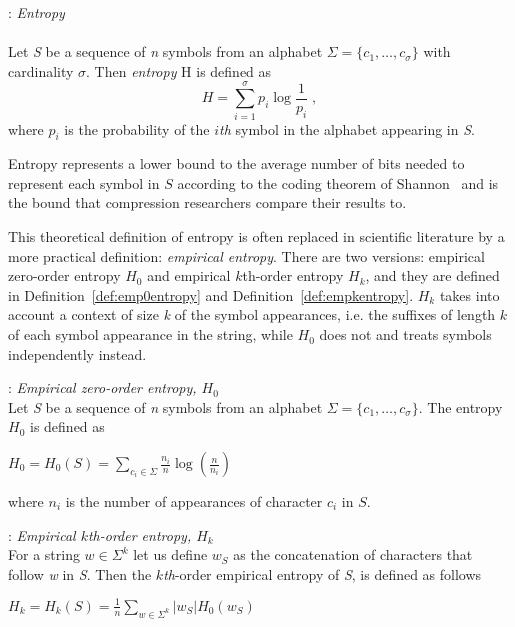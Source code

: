 \begin{floatdef}
\begin{mdframed}[nobreak, linecolor=lightgray, linewidth=2pt]
\begin{definition}\label{def:entropy}: \emph{Entropy} \\\\
Let \textit{S} be a sequence of \textit{n} symbols from an alphabet $\Sigma = \lbrace c_1, \ldots, c_\sigma \rbrace$ with cardinality $\sigma$.
Then \textit{entropy} H is defined as
\[
	H = \sum_{i=1}^{\sigma} p_i \log \frac{1}{p_i} \; ,
\]
where $p_i$ is the probability of the $i$\emph{th} symbol in the alphabet appearing in \textit{S}.
\end{definition} 
\end{mdframed}
\end{floatdef}

Entropy represents a lower bound to the average number of bits needed to represent each symbol in $S$ according to the coding theorem of Shannon~ and is the bound that compression researchers compare their results to.

This theoretical definition of entropy is often replaced in scientific literature by a more practical definition: \textit{empirical entropy}.
There are two versions: empirical zero-order entropy $H_0$ and empirical $k$th-order entropy $H_k$, and they are defined in Definition~\ref{def:emp0entropy} and Definition~\ref{def:empkentropy}. $H_k$ takes into account a context of size \textit{k} of the symbol appearances, i.e. the suffixes of length $k$ of each symbol appearance in the string, while $H_0$ does not and treats symbols independently instead. 

\begin{floatdef}
\begin{mdframed}[nobreak, linecolor=lightgray, linewidth=2pt]
\begin{definition}\label{def:emp0entropy}: \emph{Empirical zero-order entropy, $H_0$} \\
Let \textit{S} be a sequence of \textit{n} symbols from an alphabet $\Sigma = \lbrace c_1, \ldots, c_\sigma \rbrace$.
The entropy $H_0$ is defined as
\begin{center}
$H_0 = H_0(S) = \sum\limits_{c_i \in \Sigma} \frac{n_i}{n} \log(\frac{n}{n_i})$
\end{center}
where $n_i$ is the number of appearances of character $c_i$ in $S$.
\end{definition}
\begin{definition}\label{def:empkentropy}: \emph{Empirical $k$\emph{th}-order entropy, $H_k$} \\
For a string $w \in \Sigma^k$ let us define $w_S$ as the concatenation of characters that follow \textit{w} in \textit{S}. 
Then the $k$\emph{th}-order empirical entropy of \textit{S}, is defined as follows
\begin{center}
$H_k = H_k(S) = \frac{1}{n} \sum\limits_{w \in \Sigma^k} | w_S |H_0(w_S)$
\end{center}
\end{definition}
\end{mdframed}
\end{floatdef}

